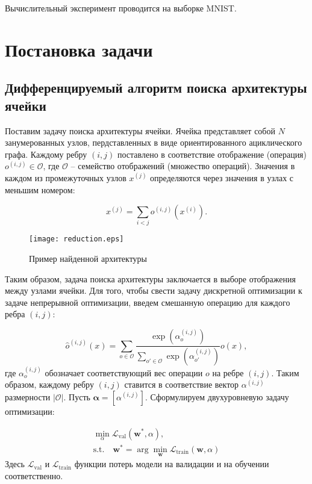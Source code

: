 \documentclass[12pt, twoside]{article}
\begin{document}
Вычислительный эксперимент проводится на выборке MNIST\cite{lecun-mnisthandwrittendigit-2010}.

\section{Постановка задачи}

\subsection{Дифференцируемый алгоритм поиска архитектуры ячейки}

Поставим задачу поиска архитектуры ячейки.
 Ячейка представляет собой $N$ занумерованных узлов, пердставленных в виде ориентированного ациклического графа. Каждому ребру $(i, j)$ поставлено в соответствие  отображение (операция) $o^{(i, j)} \in \mathcal{O}$, где $\mathcal{O}$ -- семейство отображений (множество операций). Значения в каждом из промежуточных узлов $x^{(j)}$ определяются через значения в узлах с меньшим номером:
 
 \begin{equation}
 x^{(j)} = \sum_{i < j}o^{(i, j)}(x^{(i)}).
 \end{equation}
 
 \begin{figure}[H]
 \centering
 \texttt{[image: reduction.eps]}
 \caption{Пример найденной архитектуры}
 \end{figure}
 
 Таким образом, задача поиска архитектуры заключается в выборе отображения между узлами ячейки. Для того, чтобы свести задачу дискретной оптимизации к задаче непрерывной оптимизации, введем смешанную операцию для каждого ребра $(i, j)$:

\begin{equation}
\hat{o}^{(i, j)}(x) = \sum_{o\in \mathcal{O}} \frac{\exp(\alpha_o^{(i, j)})}{\sum_{o'\in\mathcal{O}} \exp(\alpha_{o'}^{(i, j)})}o(x),
\end{equation}
где $\alpha_o^{(i, j)}$ обозначает соответствующий вес операции $o$ на ребре $(i, j)$. Таким образом, каждому ребру $(i, j)$ ставится в соответствие вектор $\alpha^{(i, j)}$ размерности $|\mathcal{O}|$. Пусть $\boldsymbol\alpha = [\alpha^{(i, j)}]$. Сформулируем двухуровневую задачу оптимизации:

\begin{equation}
\label{optim}
\begin{aligned}
\min_{\alpha}\mathcal{L}_\text{val}(\mathbf{w}^*, \alpha),\\
 \mathrm{s.t.}\quad \mathbf{w}^* = \arg\min_{\mathbf{w}}\mathcal{L}_\text{train}(\mathbf{w}, \alpha)
 \end{aligned}
\end{equation}
Здесь $\mathcal{L}_\text{val}$ и $\mathcal{L}_\text{train}$ функции потерь модели на валидации и на обучении соответственно.
\end{document}

